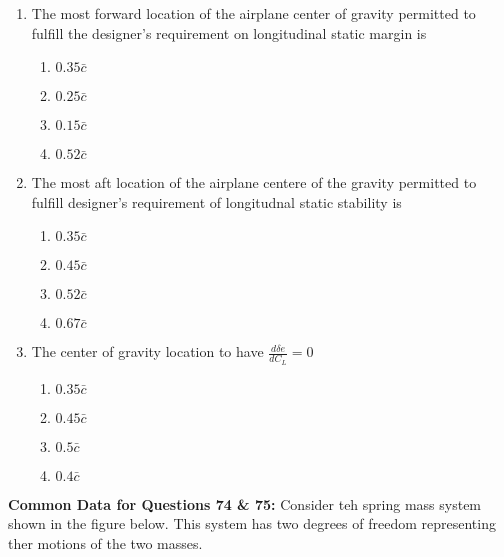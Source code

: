 \documentclass[journal]{IEEEtran}
\begin{document}
\begin{enumerate}
    \item The most forward location of the airplane center of gravity permitted to fulfill the designer's requirement on longitudinal static margin is
        \begin{enumerate}
            \item $0.35 \bar{c}$
            \item $0.25 \bar{c}$
            \item $0.15 \bar{c}$
            \item $0.52 \bar{c}$
        \end{enumerate}
    \item The most aft location of the airplane centere of the gravity permitted to fulfill designer's requirement of longitudnal static stability is
        \begin{enumerate}
            \item $0.35 \bar{c}$
            \item $0.45 \bar{c}$
            \item $0.52 \bar{c}$
            \item $0.67 \bar{c}$
        \end{enumerate}
    \item The center of gravity location to have $\displaystyle\frac{d\delta e}{dC_L}=0$
        \begin{enumerate}
            \item $0.35 \bar{c}$
            \item $0.45 \bar{c}$
            \item $0.5 \bar{c}$
            \item $0.4 \bar{c}$
        \end{enumerate}
\end{enumerate}

\textbf{Common Data for Questions 74 \& 75:} Consider teh spring mass system shown in the figure below. This system has two degrees of freedom representing ther motions of the two masses.
\end{document}
